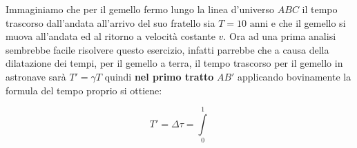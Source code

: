 \documentclass[twoside]{article}
\begin{document}
Immaginiamo che per il gemello fermo lungo la linea d'universo $ABC$ il tempo trascorso dall'andata all'arrivo del suo fratello sia $T=10 \textrm{ anni}$ e che il gemello si muova all'andata 
ed al ritorno a velocità costante $v$. Ora ad una prima analisi sembrebbe facile risolvere questo esercizio, infatti parrebbe che a causa della dilatazione dei tempi, per il gemello a terra, il tempo trascorso per il gemello in astronave sarà $T'=\gamma T$ quindi \textbf{nel primo tratto} $AB'$ applicando bovinamente la formula del tempo proprio si ottiene:

\begin{equation}
T' = \Delta \tau = \int\limits_{0}^{1}
\end{equation}


% 
% 
% 
% 
\end{document}
